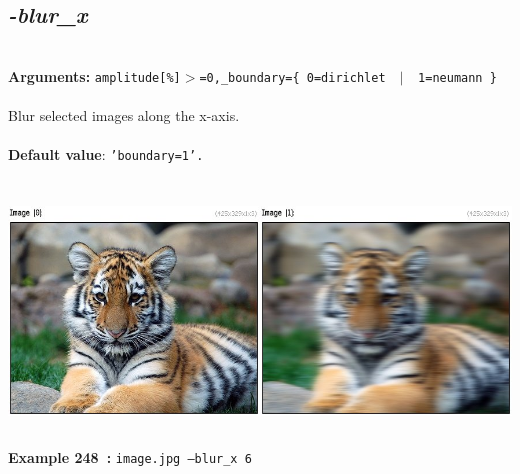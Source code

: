 \documentclass[a4paper,11pt,twoside]{book}
\begin{document}
\subsection{\emph{-blur\_x} }\vspace*{-0.5em}
~\\\textbf{Arguments: } 
{\small \texttt{amplitude[\%]$>$=0,\_boundary=\{ 0=dirichlet ~$|$~ 1=neumann \}}}\\~\\
Blur selected images along the x-axis.
~\\~\\\textbf{Default value}: {\small \texttt{'boundary=1'.}}
\begin{center}\includegraphics[keepaspectratio=true,height=7cm,width=\textwidth]{img/gmic_def248.jpg}\\
{\footnotesize \textbf{Example 248~:} \texttt{image.jpg --blur\_x 6}}
\end{center}
\end{document}
